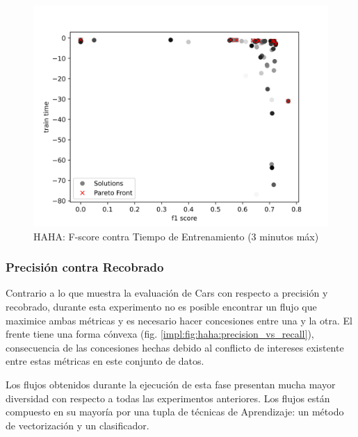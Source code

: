 \begin{figure}[ht]
    \centering
    \includegraphics[scale=0.65]{Pictures/haha_fscore_vs_time_3min.jpg}
    \caption{HAHA: F-score contra Tiempo de Entrenamiento (3 minutos m\'ax)}
    \label{impl:fig:haha:fscore_vs_time_3min}
\end{figure}

\subsubsection{Precisi\'on contra Recobrado}
Contrario a lo que muestra la evaluaci\'on de Cars con respecto a precisi\'on y recobrado, durante esta experimento no es posible encontrar un flujo que maximice ambas m\'etricas y es necesario hacer concesiones entre una y la otra. El frente tiene una forma c\'onvexa (fig. \ref{impl:fig:haha:precision_vs_recall}), consecuencia de las concesiones hechas debido al conflicto de intereses existente entre estas m\'etricas en este conjunto de datos.

Los flujos obtenidos durante la ejecuci\'on de esta fase presentan mucha mayor diversidad con respecto a todas las experimentos anteriores. Los flujos est\'an compuesto en su mayor\'ia por una tupla de t\'ecnicas de Aprendizaje: un m\'etodo de vectorizaci\'on y un clasificador.

